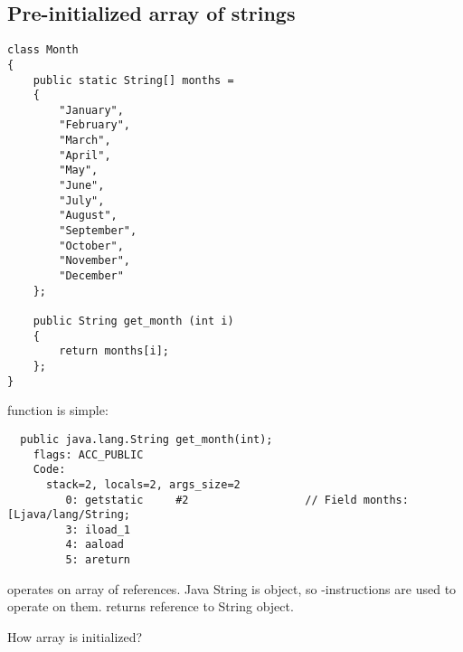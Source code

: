 \subsection{Pre-initialized array of strings}
\label{Java_2D_array_month}

\begin{lstlisting}
class Month
{
	public static String[] months = 
	{
		"January", 
		"February", 
		"March", 
		"April",
		"May",
		"June",
		"July",
		"August",
		"September",
		"October",
		"November",
		"December"
	};

	public String get_month (int i)
	{
		return months[i];
	};
} 
\end{lstlisting}

 function is simple:

\begin{lstlisting}
  public java.lang.String get_month(int);
    flags: ACC_PUBLIC
    Code:
      stack=2, locals=2, args_size=2
         0: getstatic     #2                  // Field months:[Ljava/lang/String;
         3: iload_1       
         4: aaload        
         5: areturn       
\end{lstlisting}

 operates on array of references.
Java String is object, so -instructions are used to operate on them.
 returns reference to String object.

How  array is initialized?

